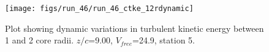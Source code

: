 \begin{figure}[H]
\centering
\texttt{[image: figs/run\_46/run\_46\_ctke\_12rdynamic]}
\caption{Plot showing dynamic variations in turbulent kinetic energy between 1 and 2 core radii. $z/c$=9.00, $V_{free}$=24.9, station 5.}
\label{fig:run_46_ctke_12rdynamic}
\end{figure}


